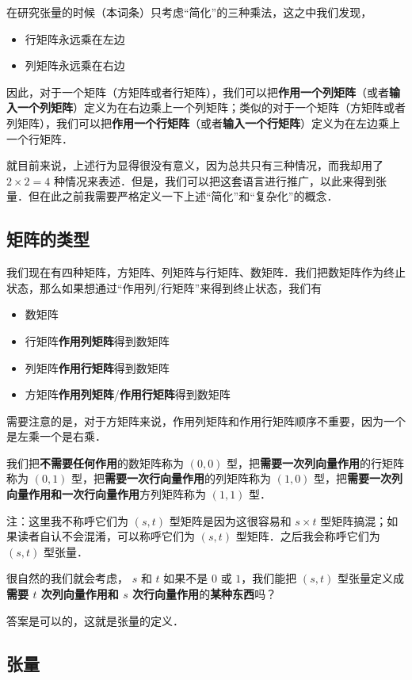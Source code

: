 在研究张量的时候（本词条）只考虑“简化”的三种乘法，这之中我们发现，
\begin{itemize}
\item 行矩阵永远乘在左边
\item 列矩阵永远乘在右边
\end{itemize}
因此，对于一个矩阵（方矩阵或者行矩阵），我们可以把\textbf{作用一个列矩阵}（或者\textbf{输入一个列矩阵}）定义为在右边乘上一个列矩阵；类似的对于一个矩阵（方矩阵或者列矩阵），我们可以把\textbf{作用一个行矩阵}（或者\textbf{输入一个行矩阵}）定义为在左边乘上一个行矩阵．

就目前来说，上述行为显得很没有意义，因为总共只有三种情况，而我却用了 $2 \times 2 = 4$ 种情况来表述．但是，我们可以把这套语言进行推广，以此来得到张量．但在此之前我需要严格定义一下上述“简化”和“复杂化”的概念．

\subsection{矩阵的类型}
我们现在有四种矩阵，方矩阵、列矩阵与行矩阵、数矩阵．我们把数矩阵作为终止状态，那么如果想通过“作用列/行矩阵”来得到终止状态，我们有
\begin{itemize}
\item 数矩阵
\item 行矩阵\textbf{作用列矩阵}得到数矩阵
\item 列矩阵\textbf{作用行矩阵}得到数矩阵
\item 方矩阵\textbf{作用列矩阵}/\textbf{作用行矩阵}得到数矩阵
\end{itemize}
需要注意的是，对于方矩阵来说，作用列矩阵和作用行矩阵顺序不重要，因为一个是左乘一个是右乘．

我们把\textbf{不需要任何作用}的数矩阵称为 $(0,0)$ 型，把\textbf{需要一次列向量作用}的行矩阵称为 $(0,1)$ 型，把\textbf{需要一次行向量作用}的列矩阵称为 $(1,0)$ 型，把\textbf{需要一次列向量作用和一次行向量作用}方列矩阵称为 $(1,1)$ 型．

注：这里我不称呼它们为 $(s, t)$ 型矩阵是因为这很容易和 $s \times t$ 型矩阵搞混；如果读者自认不会混淆，可以称呼它们为 $(s, t)$ 型矩阵．之后我会称呼它们为$(s, t)$ 型张量．

很自然的我们就会考虑， $s$ 和 $t$ 如果不是 $0$ 或 $1$，我们能把 $(s, t)$ 型张量定义成\textbf{需要 $t$ 次列向量作用和 $s$ 次行向量作用}的\textbf{某种东西}吗？

答案是可以的，这就是张量的定义．

\subsection{张量}

